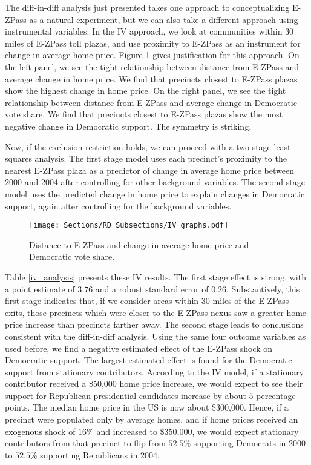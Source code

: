 
The diff-in-diff analysis just presented takes one approach to conceptualizing E-ZPass as a natural experiment, but we can also take a different approach using instrumental variables. In the IV approach, we look at communities within $30$ miles of E-ZPass toll plazas, and use proximity to E-ZPass as an instrument for change in average home price. Figure \ref{iv_graph} gives justification for this approach. On the left panel, we see the tight relationship between distance from E-ZPass and average change in home price. We find that precincts closest to E-ZPass plazas show the highest change in home price. On the right panel, we see the tight relationship between distance from E-ZPass and average change in Democratic vote share. We find that precincts closest to E-ZPass plazas show the most negative change in Democratic support. The symmetry is striking. 

Now, if the exclusion restriction holds, we can proceed with a two-stage least squares analysis. The first stage model uses each precinct's proximity to the nearest E-ZPass plaza as a predictor of change in average home price between 2000 and 2004 after controlling for other background variables. The second stage model uses the predicted change in home price to explain changes in Democratic support, again after controlling for the background variables. 

\begin{figure}[htb!]%
    \centering \texttt{[image: Sections/RD\_Subsections/IV\_graphs.pdf]}%
   \caption{Distance to E-ZPass and change in average home price and Democratic vote share.}
   \label{iv_graph}
\end{figure}

Table \ref{iv_analysis} presents these IV results. The first stage effect is strong, with a point estimate of $3.76$ and a robust standard error of $0.26$. Substantively, this first stage indicates that, if we consider areas within $30$ miles of the E-ZPass exits, those precincts which were closer to the E-ZPass nexus saw a greater home price increase than precincts farther away. The second stage leads to conclusions consistent with the diff-in-diff analysis. Using the same four outcome variables as used before, we find a negative estimated effect of the E-ZPass shock on Democratic support. The largest estimated effect is found for the Democratic support from stationary contributors. According to the IV model, if a stationary contributor received a \$50,000 home price increase, we would expect to see their support for Republican presidential candidates increase by about $5$ percentage points. The median home price in the US is now about \$300,000. Hence, if a precinct were populated only by average homes, and if home prices received an exogenous shock of $16\%$ and increased to \$350,000, we would expect stationary contributors from that precinct to flip from $52.5\%$ supporting Democrats in 2000 to $52.5\%$ supporting Republicans in 2004. 

